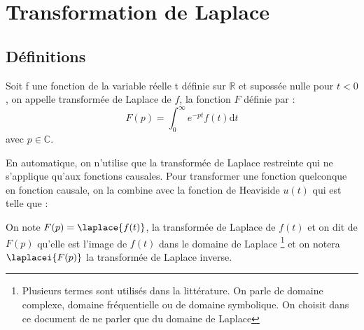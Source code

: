 \chapter{Transformation de Laplace\label{annexe-lap}}


\section{Définitions} 

Soit f une fonction de la variable réelle t définie sur $\mathbb{R}$ 
et supossée  nulle pour $t<0$, on appelle transformée de Laplace de $f$, la fonction $F$ définie par :
$$
F(p) = \int_0^\infty e^{-pt} f(t) \mathrm{d}t
$$
avec $p\in\mathbb{C}$. 

En automatique, on n'utilise que la transformée de Laplace restreinte qui 
ne s'applique qu'aux fonctions causales.
Pour transformer une fonction quelconque en fonction causale, 
on la combine avec la fonction de Heaviside $u(t)$ qui est telle que :

\begin{center}
\end{center}

On note $F(p)=\laplace{f(t)}$, la transformée de Laplace de $f(t)$ et on dit de $F(p)$ qu'elle est l'image de $f(t)$
dans le domaine de Laplace
\footnote{Plusieurs termes sont utilisés dans la littérature. On parle 
de domaine complexe, domaine fréquentielle ou de domaine symbolique. On choisit dans ce document 
de ne parler que du domaine de Laplace} et on notera $\laplacei{F(p)}$ la transformée de Laplace inverse.
